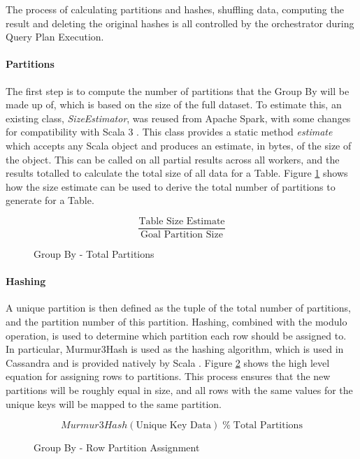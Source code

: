 The process of calculating partitions and hashes, shuffling data, computing the result and deleting the original hashes is all controlled by the orchestrator during Query Plan Execution.

\paragraph{Partitions}
The first step is to compute the number of partitions that the Group By will be made up of, which is based on the size of the full dataset. To estimate this, an existing class, \textit{SizeEstimator}, was reused from Apache Spark, with some changes for compatibility with Scala 3 \cite{zaharia2016spark}. This class provides a static method \textit{estimate} which accepts any Scala object and produces an estimate, in bytes, of the size of the object. This can be called on all partial results across all workers, and the results totalled to calculate the total size of all data for a Table. Figure \ref{fig:group-by-num-partitions} shows how the size estimate can be used to derive the total number of partitions to generate for a Table.

\begin{figure}[h]
	\centering
	\[ \frac{\text{Table Size Estimate}}{\text{Goal Partition Size}} \]
	\caption{Group By - Total Partitions}
	\label{fig:group-by-num-partitions}
\end{figure}



\paragraph{Hashing} 
A unique partition is then defined as the tuple of the total number of partitions, and the partition number of this partition. Hashing, combined with the modulo operation, is used to determine which partition each row should be assigned to. In particular, Murmur3Hash is used as the hashing algorithm, which is used in Cassandra and is provided natively by Scala \cite{murmur3hash}. Figure \ref{fig:group-by-partition-assign} shows the high level equation for assigning rows to partitions. This process ensures that the new partitions will be roughly equal in size, and all rows with the same values for the unique keys will be mapped to the same partition.

\begin{figure}[h]
	\centering
	\[ Murmur3Hash(\text{Unique Key Data}) \; \%  \; \text{Total Partitions} \]
	\caption{Group By - Row Partition Assignment}
	\label{fig:group-by-partition-assign}
\end{figure} 

